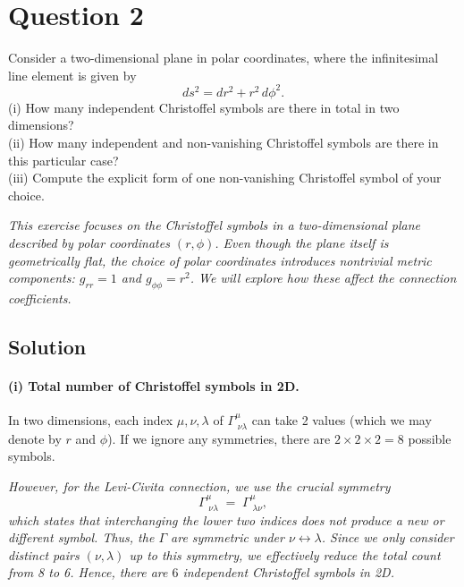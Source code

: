     \pagebreak

    \section*{Question 2}

    Consider a two-dimensional plane in polar coordinates, where the infinitesimal line element is given by
    \[
        ds^2 = dr^2 + r^2\,d\phi^2.
    \]
    (i) How many independent Christoffel symbols are there in total in two dimensions?\\
    (ii) How many independent and non-vanishing Christoffel symbols are there in this particular case?\\
    (iii) Compute the explicit form of one non-vanishing Christoffel symbol of your choice.

    \emph{This exercise focuses on the Christoffel symbols in a two-dimensional plane described by polar coordinates \((r,\phi)\). Even though the plane itself is geometrically flat, the choice of polar coordinates introduces nontrivial metric components: \(g_{rr} = 1\) and \(g_{\phi\phi} = r^2\). We will explore how these affect the connection coefficients.}

    \subsection*{Solution}

    \paragraph{(i) Total number of Christoffel symbols in 2D.}

    In two dimensions, each index \(\mu,\nu,\lambda\) of \(\Gamma^\mu_{\;\nu\lambda}\) can take 2 values (which we may denote by \(r\) and \(\phi\)). If we ignore any symmetries, there are \(2 \times 2 \times 2 = 8\) possible symbols.

    \emph{However, for the Levi-Civita connection, we use the crucial symmetry}
    \[
        \Gamma^\mu_{\;\nu\lambda} \;=\; \Gamma^\mu_{\;\lambda\nu},
    \]
    \emph{which states that interchanging the lower two indices does not produce a new or different symbol. Thus, the \(\Gamma\) are symmetric under \(\nu \leftrightarrow \lambda\). Since we only consider distinct pairs \((\nu,\lambda)\) up to this symmetry, we effectively reduce the total count from 8 to 6. Hence, there are \(\boxed{6}\) independent Christoffel symbols in 2D.}

